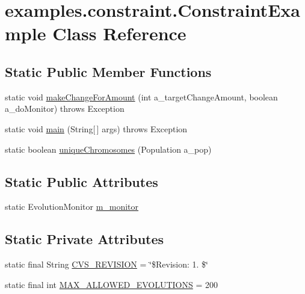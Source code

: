 \hypertarget{classexamples_1_1constraint_1_1_constraint_example}{\section{examples.\-constraint.\-Constraint\-Example Class Reference}
\label{classexamples_1_1constraint_1_1_constraint_example}
}
\subsection*{Static Public Member Functions}
\begin{DoxyCompactItemize}
\item 
static void \hyperlink{classexamples_1_1constraint_1_1_constraint_example_ada505ec492fbb8c2792f5701cbbc8664}{make\-Change\-For\-Amount} (int a\-\_\-target\-Change\-Amount, boolean a\-\_\-do\-Monitor)  throws Exception 
\item 
static void \hyperlink{classexamples_1_1constraint_1_1_constraint_example_a2bed2fb63476a6b590fc1add48ab25c6}{main} (String\mbox{[}$\,$\mbox{]} args)  throws Exception 
\item 
static boolean \hyperlink{classexamples_1_1constraint_1_1_constraint_example_ae62b93079a12dd847bc1da931592e4b0}{unique\-Chromosomes} (Population a\-\_\-pop)
\end{DoxyCompactItemize}
\subsection*{Static Public Attributes}
\begin{DoxyCompactItemize}
\item 
static Evolution\-Monitor \hyperlink{classexamples_1_1constraint_1_1_constraint_example_a9545f75c956d587efbf4fa0d7a2dd71c}{m\-\_\-monitor}
\end{DoxyCompactItemize}
\subsection*{Static Private Attributes}
\begin{DoxyCompactItemize}
\item 
static final String \hyperlink{classexamples_1_1constraint_1_1_constraint_example_ac19bc67be381cb06e02a06f01b92289e}{C\-V\-S\-\_\-\-R\-E\-V\-I\-S\-I\-O\-N} = \char`\"{}\$Revision\-: 1. \$\char`\"{}
\item 
static final int \hyperlink{classexamples_1_1constraint_1_1_constraint_example_a85391474e821d68581bf3f8e0c88808c}{M\-A\-X\-\_\-\-A\-L\-L\-O\-W\-E\-D\-\_\-\-E\-V\-O\-L\-U\-T\-I\-O\-N\-S} = 200
\end{DoxyCompactItemize}


